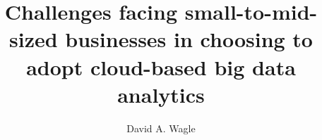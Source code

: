 \title{Challenges facing small-to-mid-sized businesses in choosing to adopt cloud-based big data analytics}

\author{David A. Wagle}






